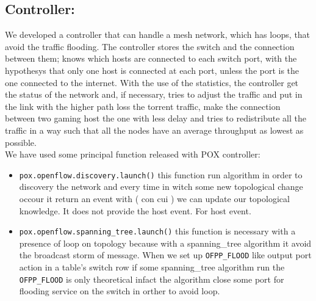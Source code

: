 \documentclass[conference,10pt]{IEEEtran}
\begin{document}
\subsection{Controller:}
We developed a controller that can handle a mesh network, which has loops, that avoid
the traffic flooding. The controller stores the switch and the connection between them;
knows which hosts are connected to each switch port, with the hypothesys that only one
host is connected at each port, unless the port is the one connected to the internet.
With the use of the statistics, the controller get the status of the network and, if necessary,
tries to adjust the traffic and put in the link with the higher path loss the torrent traffic,
make the connection between two gaming host the one with less delay and tries to redistribute all the traffic in a way
such that all the nodes have an average throughput as lowest as possible.
\\
\newline
We have used some principal function released with POX controller:
\begin{itemize}
 \item \texttt{pox.openflow.discovery.launch()} this function run algorithm in order to discovery the network and every time in witch some new 
 topological change occour it return an event with ( con cui ) we can update our topological knowledge.
 It does not provide the host event. For host event\cite{pox}.
 \item \texttt{pox.openflow.spanning_tree.launch()} this function is necessary with a presence of loop on topology 
 because with a spanning_tree algorithm it avoid the broadcast storm of message. When we set up \texttt{OFPP_FLOOD} like output port action in a table's 
 switch row if some spanning_tree algorithm run the \texttt{OFPP_FLOOD} is only theoretical infact the algorithm close some port for flooding service 
 on the switch in orther to avoid loop\cite{pox}.
\end{itemize}
\end{document}
